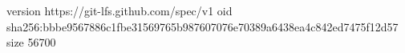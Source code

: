 version https://git-lfs.github.com/spec/v1
oid sha256:bbbe9567886c1fbe31569765b987607076e70389a6438ea4c842ed7475f12d57
size 56700
